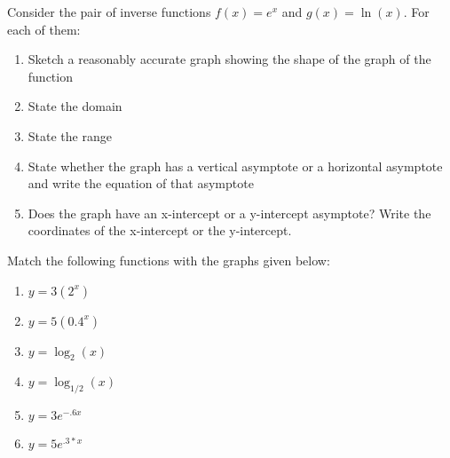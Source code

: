 \begin{puzzle} Consider the pair of inverse functions \(f(x) = e^x\) and  \( g(x)= \ln(x)\). For each of them:
    \begin{enumerate}
        \item Sketch a reasonably accurate graph showing the shape of the graph of the function
        \item State the domain
        \item State the range
        \item State whether the graph has a vertical asymptote or a horizontal asymptote and write the equation of that asymptote
        \item Does the graph have an x-intercept or a y-intercept asymptote? Write the coordinates of the x-intercept or the y-intercept.
    \end{enumerate}
\end{puzzle}

\begin{puzzle}
    Match the following functions with the graphs given below:
    \begin{enumerate}
        \item $y = 3(2^x)$
        \item $y = 5(0.4^x)$
        \item $y = \log_2(x)$
        \item $y = \log_{1/2}(x)$
        \item $y = 3e^{-.6x}$
        \item $y = 5e^{.3*x}$
    \end{enumerate}
\end{puzzle}



